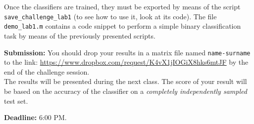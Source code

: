\documentclass[DIN, pagenumber=false, fontsize=11pt, parskip=half]{scrartcl}
\begin{document}
Once the classifiers are trained, they must be exported by means of the script \texttt{save\_challenge\_lab1}   (to see how to use it, look at its code). The file \texttt{demo\_lab1.m} contains a code snippet to perform a simple binary classification task by means of the previously presented scripts.



\begin{framed}
\textbf{Submission:}
You should drop your results in a matrix file named \texttt{name-surname} to the link: \url{https://www.dropbox.com/request/K4vX1jIOGiX8hks6mtJF} by the end of the challenge session.\\
The results will be presented during the next class. The score of your result will be based on the accuracy of the classifier on a \textit{completely independently sampled} test set.

\textbf{Deadline:} 6:00 PM.
\end{framed}
\end{document}
